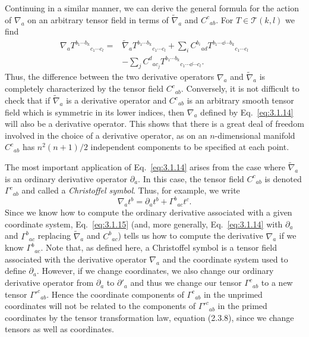 Continuing in a similar manner, we can derive the general formula for the action
of $\nabla_a$ on an arbitrary tensor field in terms of $\widetilde\nabla_a$ and $C^c{}_{ab}$. For $T\in\mathcal T(k,l)$ we find
\begin{equation}
  \begin{aligned}
    \nabla_aT^{b_1\cdots b_k}{}_{c_1\cdots c_l}
    ={}&\widetilde\nabla_aT^{b_1\cdots b_k}{}_{c_1\cdots c_l}
    +\sum_i C^{b_i}{}_{ad}T^{b_1\cdots \dd\cdots b_k}{}_{c_1\cdots c_l}\\
    &-\sum_j C^d{}_{ac_j}T^{b_1\cdots b_k}{}_{c_1\cdots \dd\cdots c_l}.
  \end{aligned}
  \tag{3.1.14}\label{eq:3.1.14}
\end{equation}
Thus, the difference between the two derivative operators $\nabla_a$ and $\widetilde\nabla_a$ is completely
characterized by the tensor field $C^c{}_{ab}$. Conversely, it is not difficult to check that if
$\widetilde\nabla_a$ is a derivative operator and $C^c{}_{ab}$ is an arbitrary smooth tensor field which is
symmetric in its lower indices, then $\nabla_a$ defined by Eq.~\eqref{eq:3.1.14} will also be a
derivative operator. This shows that there is a great deal of freedom involved in the
choice of a derivative operator, as on an $n$-dimensional manifold $C^c{}_{ab}$ has $n^2(n+1)/2$
independent components to be specified at each point.

The most important application of Eq.~\eqref{eq:3.1.14} arises from the case where $\widetilde\nabla_a$
is an ordinary derivative operator $\partial_a$. In this case, the tensor field $C^c{}_{ab}$ is denoted $\Gamma^c{}_{ab}$
and called a \emph{Christoffel symbol}. Thus, for example, we write
\begin{equation}
  \nabla_at^b=\partial_at^b+\Gamma^b{}_{ac}t^c.
  \tag{3.1.15}\label{eq:3.1.15}
\end{equation}
Since we know how to compute the ordinary derivative associated with a given
coordinate system, Eq.~\eqref{eq:3.1.15} (and, more generally, Eq.~\eqref{eq:3.1.14} with $\partial_a$ and
$\Gamma^b{}_{ac}$ replacing $\widetilde\nabla_a$ and $C^b{}_{ac}$) tells us how to compute the derivative $\nabla_a$ if we know
$\Gamma^b{}_{ac}$. Note that, as defined here, a Christoffel symbol is a tensor field associated with the
derivative operator $\nabla_a$ and the coordinate system used to define $\partial_a$. However, if we
change coordinates, we also change our ordinary derivative operator from $\partial_a$ to $\partial'_a$
and thus we change our tensor $\Gamma^c{}_{ab}$ to a new tensor $\Gamma'^c{}_{ab}$. Hence the coordinate
components of $\Gamma^c{}_{ab}$ in the unprimed coordinates will not be related to the components
of $\Gamma'^c{}_{ab}$ in the primed coordinates by the tensor transformation law, equation (2.3.8),
since we change tensors as well as coordinates.

